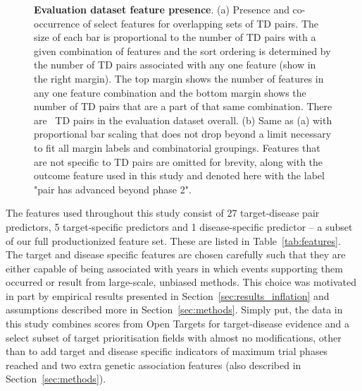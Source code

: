 \documentclass{article}
\begin{document}
\begin{figure}[!htb]
  \centering
  \captionsetup{width=.9\linewidth}
  \captionsetup[subfigure]{labelformat=empty}
  \qquad
  \caption{
    \textbf{Evaluation dataset feature presence}.
    (a) Presence and co-occurrence of select features for overlapping sets of TD pairs. The size of each bar is proportional to the number of TD pairs with a given combination of features and the sort ordering is determined by the number of TD pairs associated with any one feature (show in the right margin). The top margin shows the number of features in any one feature combination and the bottom margin shows the number of TD pairs that are a part of that same combination. There are \evaluationDatasetPairCount\ TD pairs in the evaluation dataset overall.
    (b) Same as (a) with proportional bar scaling that does not drop beyond a limit necessary to fit all margin labels and combinatorial groupings. Features that are not specific to TD pairs are omitted for brevity, along with the outcome feature used in this study and denoted here with the label "pair has advanced beyond phase 2".
  }
  \label{fig:feature_presence}
\end{figure}

The features used throughout this study consist of 27 target-disease pair predictors, 5 target-specific predictors and 1 disease-specific predictor -- a subset of our full productionized feature set. These are listed in Table~\ref{tab:features}. The target and disease specific features are chosen carefully such that they are either capable of being associated with years in which events supporting them occurred or result from large-scale, unbiased methods. This choice was motivated in part by empirical results presented in Section~\ref{sec:results_inflation} and assumptions described more in Section~\ref{sec:methods}. Simply put, the data in this study combines scores from Open Targets for target-disease evidence and a select subset of target prioritisation \cite{OTtargetPrioritisation} fields with almost no modifications, other than to add target and disease specific indicators of maximum trial phases reached and two extra genetic association features (also described in Section~\ref{sec:methods}).
\end{document}
